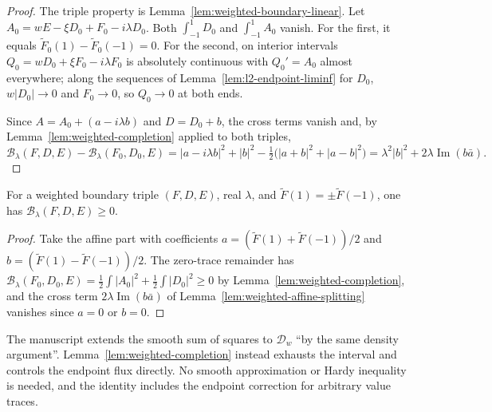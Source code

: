 \begin{proof}
\leanok
The triple property is Lemma~\ref{lem:weighted-boundary-linear}. Let
$A_0=wE-\xi D_0+F_0-i\lambda D_0$. Both $\int_{-1}^1D_0$ and
$\int_{-1}^1A_0$ vanish. For the first, it equals
$\widetilde F_0(1)-\widetilde F_0(-1)=0$. For the second, on interior
intervals $Q_0=wD_0+\xi F_0-i\lambda F_0$ is absolutely continuous with
$Q_0'=A_0$ almost everywhere; along the sequences of
Lemma~\ref{lem:l2-endpoint-liminf} for $D_0$, $w|D_0|\to0$ and
$F_0\to0$, so $Q_0\to0$ at both ends.

Since $A=A_0+(a-i\lambda b)$ and $D=D_0+b$, the cross terms vanish and,
by Lemma~\ref{lem:weighted-completion} applied to both triples,
\[
  \mathcal B_\lambda(F,D,E)-\mathcal B_\lambda(F_0,D_0,E)
  =|a-i\lambda b|^2+|b|^2-\tfrac12\bigl(|a+b|^2+|a-b|^2\bigr)
  =\lambda^2|b|^2+2\lambda\operatorname{Im}(b\bar a).
\]
\end{proof}

\begin{lemma}
\label{lem:weighted-boundary-positivity}
\leanok
For a weighted boundary triple $(F,D,E)$, real $\lambda$, and
$\widetilde F(1)=\pm\widetilde F(-1)$, one has
$\mathcal B_\lambda(F,D,E)\ge0$.
\end{lemma}

\begin{proof}
\leanok
Take the affine part with coefficients
$a=(\widetilde F(1)+\widetilde F(-1))/2$ and
$b=(\widetilde F(1)-\widetilde F(-1))/2$. The zero-trace remainder has
$\mathcal B_\lambda(F_0,D_0,E)=\frac12\int|A_0|^2+\frac12\int|D_0|^2\ge0$
by Lemma~\ref{lem:weighted-completion}, and the cross term
$2\lambda\operatorname{Im}(b\bar a)$ of
Lemma~\ref{lem:weighted-affine-splitting} vanishes since $a=0$ or $b=0$.
\end{proof}

\begin{remark}
The manuscript extends the smooth sum of squares to $\mathcal D_w$ ``by the
same density argument''. Lemma~\ref{lem:weighted-completion} instead
exhausts the interval and controls the endpoint flux directly. No smooth
approximation or Hardy inequality is needed, and the identity includes
the endpoint correction for arbitrary value traces.
\end{remark}

